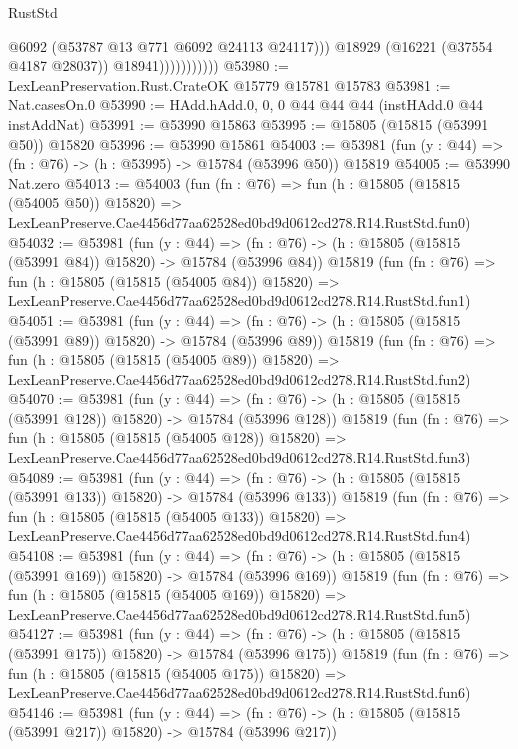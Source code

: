 \begin{lexlean}{RustStd}
\begin{coremodule}
                              @6092
                              (@53787 @13 @771 @6092 @24113 @24117)))
                          @18929
                          (@16221 (@37554 @4187 @28037))
                          @18941)))))))))))
@53980 := LexLeanPreservation.Rust.CrateOK @15779 @15781 @15783
@53981 := Nat.casesOn.{0}
@53990 := HAdd.hAdd.{0, 0, 0} @44 @44 @44 (instHAdd.{0} @44 instAddNat)
@53991 := @53990 @15863
@53995 := @15805 (@15815 (@53991 @50)) @15820
@53996 := @53990 @15861
@54003 := @53981 (fun (y : @44) => (fn : @76) -> (h : @53995) -> @15784 (@53996 @50)) @15819
@54005 := @53990 Nat.zero
@54013 := @54003
    (fun (fn : @76) =>
    fun (h : @15805 (@15815 (@54005 @50)) @15820) =>
    LexLeanPreserve.Cae4456d77aa62528ed0bd9d0612cd278.R14.RustStd.fun0)
@54032 := @53981
    (fun (y : @44) =>
    (fn : @76) -> (h : @15805 (@15815 (@53991 @84)) @15820) -> @15784 (@53996 @84))
    @15819
    (fun (fn : @76) =>
    fun (h : @15805 (@15815 (@54005 @84)) @15820) =>
    LexLeanPreserve.Cae4456d77aa62528ed0bd9d0612cd278.R14.RustStd.fun1)
@54051 := @53981
    (fun (y : @44) =>
    (fn : @76) -> (h : @15805 (@15815 (@53991 @89)) @15820) -> @15784 (@53996 @89))
    @15819
    (fun (fn : @76) =>
    fun (h : @15805 (@15815 (@54005 @89)) @15820) =>
    LexLeanPreserve.Cae4456d77aa62528ed0bd9d0612cd278.R14.RustStd.fun2)
@54070 := @53981
    (fun (y : @44) =>
    (fn : @76) -> (h : @15805 (@15815 (@53991 @128)) @15820) -> @15784 (@53996 @128))
    @15819
    (fun (fn : @76) =>
    fun (h : @15805 (@15815 (@54005 @128)) @15820) =>
    LexLeanPreserve.Cae4456d77aa62528ed0bd9d0612cd278.R14.RustStd.fun3)
@54089 := @53981
    (fun (y : @44) =>
    (fn : @76) -> (h : @15805 (@15815 (@53991 @133)) @15820) -> @15784 (@53996 @133))
    @15819
    (fun (fn : @76) =>
    fun (h : @15805 (@15815 (@54005 @133)) @15820) =>
    LexLeanPreserve.Cae4456d77aa62528ed0bd9d0612cd278.R14.RustStd.fun4)
@54108 := @53981
    (fun (y : @44) =>
    (fn : @76) -> (h : @15805 (@15815 (@53991 @169)) @15820) -> @15784 (@53996 @169))
    @15819
    (fun (fn : @76) =>
    fun (h : @15805 (@15815 (@54005 @169)) @15820) =>
    LexLeanPreserve.Cae4456d77aa62528ed0bd9d0612cd278.R14.RustStd.fun5)
@54127 := @53981
    (fun (y : @44) =>
    (fn : @76) -> (h : @15805 (@15815 (@53991 @175)) @15820) -> @15784 (@53996 @175))
    @15819
    (fun (fn : @76) =>
    fun (h : @15805 (@15815 (@54005 @175)) @15820) =>
    LexLeanPreserve.Cae4456d77aa62528ed0bd9d0612cd278.R14.RustStd.fun6)
@54146 := @53981
    (fun (y : @44) =>
    (fn : @76) -> (h : @15805 (@15815 (@53991 @217)) @15820) -> @15784 (@53996 @217))

\end{coremodule}
\end{lexlean}
